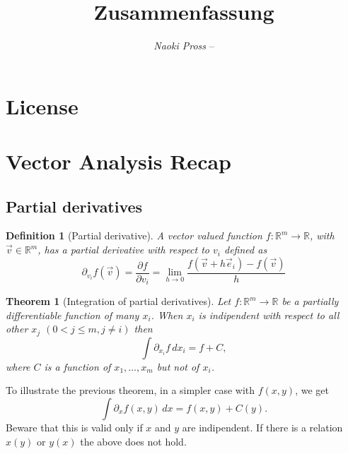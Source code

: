 \documentclass[margin=normal]{tex/hsrzf}
\author{\textsl{Naoki Pross} -- \texttt{\theauthoremail}}
\title{\texttt{\themodule} Zusammenfassung}
\date{\thesemester}
\theoremstyle{elmagzf}
\newtheorem{theorem}{Theorem}
\newtheorem{definition}{Definition}
\begin{document}

\maketitle


\tableofcontents

\section*{License}
\doclicenseThis

\clearpage
\twocolumn
\setcounter{page}{1}

\section{Vector Analysis Recap}

\subsection{Partial derivatives}

\begin{definition}[Partial derivative]
  A vector valued function \(f: \mathbb{R}^m\to\mathbb{R}\), with
  \(\vec{v}\in\mathbb{R}^m\), has a partial derivative with respect to \(v_i\)
  defined as
  \[
    \partial_{v_i} f(\vec{v})
      = \frac{\partial f}{\partial v_i}
      = \lim_{h\to 0} \frac{f(\vec{v} + h\vec{e}_i) - f(\vec{v})}{h}
  \]
\end{definition}

\begin{theorem}[Integration of partial derivatives]
  Let \(f: \mathbb{R}^m\to\mathbb{R}\) be a partially differentiable function
  of many \(x_i\). When \(x_i\) is \emph{indipendent} with respect to all other
  \(x_j\) \((0 < j \leq m, j \neq i)\) then
  \[
    \int \partial_{x_i} f \,d x_i = f + C,
  \]
  where \(C\) is a function of \(x_1, \ldots, x_m\) but not of \(x_i\).
\end{theorem}

To illustrate the previous theorem, in a simpler case with \(f(x,y)\), we get
\[
  \int \partial_x f(x,y) \,dx = f(x, y) + C(y).
\]
Beware that this is valid only if \(x\) and \(y\) are indipendent.
If there is a relation \(x(y)\) or \(y(x)\) the above does not hold.
\end{document}
